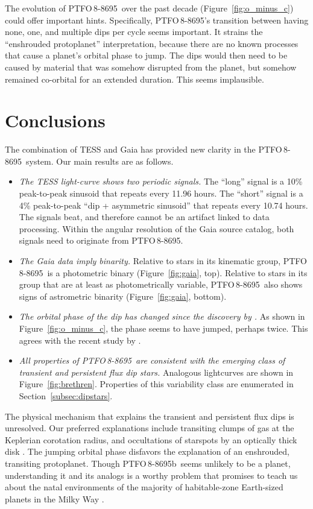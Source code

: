 \documentclass[12pt,twocolumn,tighten]{aastex62}
\newcommand{\ptfo}{PTFO$\,$8-8695}
\newcommand{\ptfob}{PTFO$\,$8-8695b}
\begin{document}
The evolution of \ptfo\
over the past decade (Figure~\ref{fig:o_minus_c}) could offer important
hints.  Specifically, \ptfo's transition between having none, one, and
multiple dips per cycle seems important.  It strains the ``enshrouded
protoplanet'' interpretation, because there are no known processes
that cause a planet's orbital phase to jump.  The dips would then need
to be caused by material that was somehow disrupted from the planet,
but somehow remained co-orbital for an extended duration. This seems
implausible.


\section{Conclusions}
\label{sec:conclusions}

The combination of TESS and Gaia has provided new
clarity in the \ptfo\ system.  Our main results are as follows.
\begin{itemize}
  \item {\it The TESS light-curve shows two periodic signals.} The
    ``long'' signal is a 10\% peak-to-peak sinusoid that repeats every
    11.96 hours.  The ``short'' signal is a 4\% peak-to-peak ``dip +
    asymmetric sinusoid'' that repeats every 10.74 hours. The signals
    beat, and therefore cannot be an artifact linked to data
    processing.
    Within the angular resolution of the Gaia source
    catalog, both signals need to originate from \ptfo.
  \item {\it The Gaia data imply binarity.} Relative to stars in its
    kinematic group, \ptfo\ is a photometric binary
    (Figure~\ref{fig:gaia}, top).  Relative to stars in its group that
    are at least as photometrically variable, \ptfo\ also shows
    signs of astrometric binarity (Figure~\ref{fig:gaia}, bottom).
  \item {\it The orbital phase of the dip has changed since the
    discovery by \citet{van_eyken_ptf_2012}.} As shown in
    Figure~\ref{fig:o_minus_c}, the phase seems to have jumped,
    perhaps twice. This agrees with the recent study by
    \citet{tanimoto_evidence_2020}.
  \item {\it All properties of \ptfo\ are consistent with the emerging
    class of transient and persistent flux dip stars.} Analogous
    lightcurves are shown in Figure~\ref{fig:brethren}.  Properties of
    this variability class are enumerated in
    Section~\ref{subsec:dipstars}.
\end{itemize}

The physical mechanism that explains the transient and persistent flux
dips is unresolved. Our preferred explanations include
transiting clumps of gas at the Keplerian corotation radius, and
occultations of starspots by an optically thick disk \citep[{\it
e.g.},][]{stauffer_orbiting_2017,david_transient_2017,zhan_complex_2019}.
The jumping orbital phase disfavors the explanation of an
enshrouded, transiting protoplanet.  Though \ptfob\ seems unlikely
to be a planet, understanding it and its analogs is a worthy
problem that promises to teach us about the natal environments of the
majority of habitable-zone Earth-sized planets in the Milky Way
\citep{dressing_occurrence_2013}.
\end{document}
